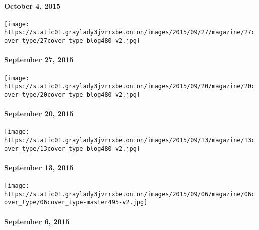 \hypertarget{october-4-2015}{%
\paragraph{October 4, 2015}\label{october-4-2015}}

\href{http://www.nytimes3xbfgragh.onion/indexes/2015/09/27/magazine/index.html}{}

\texttt{[image: https://static01.graylady3jvrrxbe.onion/images/2015/09/27/magazine/27cover\_type/27cover\_type-blog480-v2.jpg]}

\hypertarget{september-27-2015}{%
\paragraph{September 27, 2015}\label{september-27-2015}}

\href{http://www.nytimes3xbfgragh.onion/indexes/2015/09/20/magazine/index.html}{}

\texttt{[image: https://static01.graylady3jvrrxbe.onion/images/2015/09/20/magazine/20cover\_type/20cover\_type-blog480-v2.jpg]}

\hypertarget{september-20-2015}{%
\paragraph{September 20, 2015}\label{september-20-2015}}

\href{http://www.nytimes3xbfgragh.onion/indexes/2015/09/13/magazine/index.html}{}

\texttt{[image: https://static01.graylady3jvrrxbe.onion/images/2015/09/13/magazine/13cover\_type/13cover\_type-blog480-v2.jpg]}

\hypertarget{september-13-2015}{%
\paragraph{September 13, 2015}\label{september-13-2015}}

\href{http://www.nytimes3xbfgragh.onion/indexes/2015/09/06/magazine/index.html}{}

\texttt{[image: https://static01.graylady3jvrrxbe.onion/images/2015/09/06/magazine/06cover\_type/06cover\_type-master495-v2.jpg]}

\hypertarget{september-6-2015}{%
\paragraph{September 6, 2015}\label{september-6-2015}}

